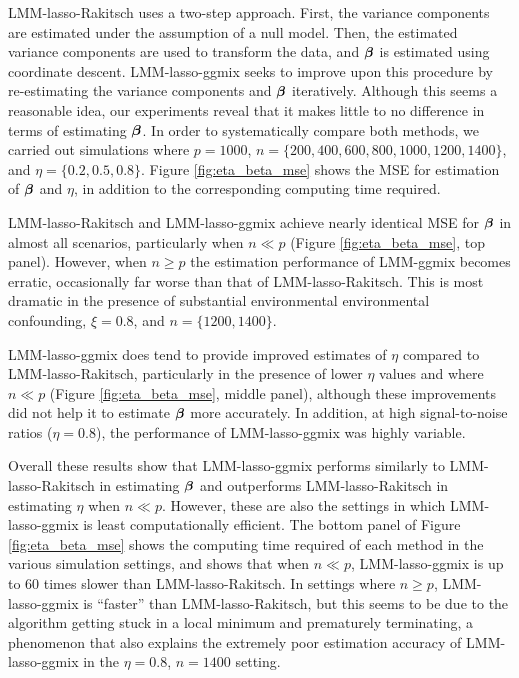 LMM-lasso-Rakitsch uses a two-step approach. First, the variance components are estimated under the assumption of a null model. Then, the estimated variance components are used to transform the data, and $\boldsymbol{\beta}{}$ is estimated using coordinate descent. LMM-lasso-ggmix seeks to improve upon this procedure by re-estimating the variance components and $\boldsymbol{\beta}{}$ iteratively. Although this seems a reasonable idea, our experiments reveal that it makes little to no difference in terms of estimating $\boldsymbol{\beta}{}$. In order to systematically compare both methods, we carried out simulations where $p = 1000$, $n = \{200, 400, 600, 800, 1000, 1200, 1400\}$, and $\eta = \{0.2, 0.5, 0.8\}$. Figure \ref{fig:eta_beta_mse} shows the MSE for estimation of $\boldsymbol{\beta}{}$ and $\eta$, in addition to the corresponding computing time required. 

LMM-lasso-Rakitsch and LMM-lasso-ggmix achieve nearly identical MSE for $\boldsymbol{\beta}{}$ in almost all scenarios, particularly when $n \ll p$ (Figure \ref{fig:eta_beta_mse}, top panel). However, when $n \ge p$ the estimation performance of LMM-ggmix becomes erratic, occasionally far worse than that of LMM-lasso-Rakitsch. This is most dramatic in the presence of substantial environmental environmental confounding, $\xi = 0.8$, and $n = \{1200, 1400\}$. 

LMM-lasso-ggmix does tend to provide improved estimates of $\eta$ compared to LMM-lasso-Rakitsch, particularly in the presence of lower $\eta$ values and where $n \ll p$ (Figure \ref{fig:eta_beta_mse}, middle panel), although these improvements did not help it to estimate $\boldsymbol{\beta}{}$ more accurately. In addition, at high signal-to-noise ratios ($\eta=0.8$), the performance of LMM-lasso-ggmix was highly variable.

Overall these results show that LMM-lasso-ggmix performs similarly to LMM-lasso-Rakitsch in estimating $\boldsymbol{\beta}{}$ and outperforms LMM-lasso-Rakitsch in estimating $\eta$ when $n \ll p$. However, these are also the settings in which LMM-lasso-ggmix is least computationally efficient. The bottom panel of Figure \ref{fig:eta_beta_mse} shows the computing time required of each method in the various simulation settings, and shows that when $n \ll p$, LMM-lasso-ggmix is up to 60 times slower than LMM-lasso-Rakitsch. In settings where $n \ge p$, LMM-lasso-ggmix is ``faster'' than LMM-lasso-Rakitsch, but this seems to be due to the algorithm getting stuck in a local minimum and prematurely terminating, a phenomenon that also explains the extremely poor estimation accuracy of LMM-lasso-ggmix in the $\eta=0.8$, $n=1400$ setting.

